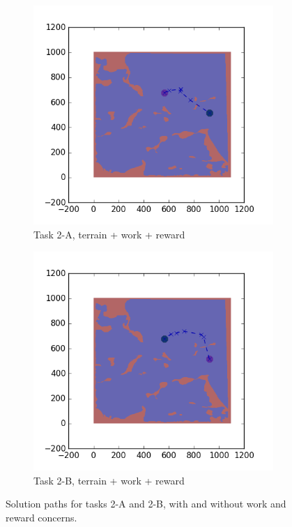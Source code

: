 \documentclass{tamuccthesis}
\begin{document}
\begin{figure}
  \begin{subfigure}[b]{0.4\textwidth}
        \centering
        \includegraphics[width=\textwidth,trim={4cm 3cm 2cm 3cm},clip]{EXP3RG_PathBa_-1_-1_-1_-1.png}
        \caption{{\small Task 2-A, terrain + work + reward}}    
        \label{fig:Path_2-A_terrain_work_reward}
    \end{subfigure}
    \hfill
    \begin{subfigure}[b]{0.4\textwidth}  
        \centering 
        \includegraphics[width=\textwidth,trim={4cm 3cm 2cm 3cm},clip]{EXP3RG_PathBb_-1_-1_-1_-1.png}
        \caption{Task 2-B, terrain + work + reward} 
        \label{fig:Path_2-B_terrain_work_reward}
    \end{subfigure}

    \caption{Solution paths for tasks 2-A and 2-B, with and without work and reward concerns.}
    \label{fig:Paths_2-A_2-B}
\end{figure}
\end{document}
